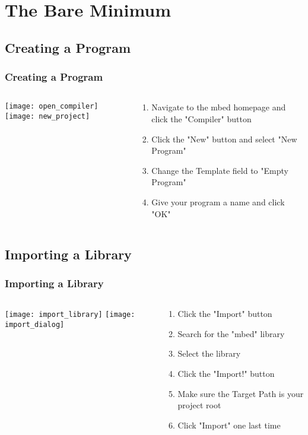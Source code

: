 \section{The Bare Minimum}
\label{sec:bare_minimum}

\subsection{Creating a Program}
\label{sub:creating_a_program}
\begin{frame}
	\frametitle{Creating a Program}
	\begin{columns}[T]
		\begin{column}{0.5\textwidth}
			\texttt{[image: open\_compiler]}
			\vspace{1ex}
			\texttt{[image: new\_project]}
		\end{column}
		\begin{column}{0.5\textwidth}
			\begin{enumerate}
				\item Navigate to the mbed homepage and click the "Compiler" button
				\item Click the "New" button and select "New Program"
				\item Change the Template field to "Empty Program"
				\item Give your program a name and click "OK"
			\end{enumerate}
		\end{column}
	\end{columns}
\end{frame}

\subsection{Importing a Library}
\label{sub:importing_a_library}
\begin{frame}
	\frametitle{Importing a Library}
	\begin{columns}[T]
		\begin{column}{0.5\textwidth}
			\texttt{[image: import\_library]}
			\vspace{1ex}
			\texttt{[image: import\_dialog]}
		\end{column}
		\begin{column}{0.5\textwidth}
			\begin{enumerate}
				\item Click the "Import" button
				\item Search for the "mbed" library
				\item Select the library
				\item Click the "Import!" button
				\item Make sure the Target Path is your project root
				\item Click "Import" one last time
			\end{enumerate}
		\end{column}
	\end{columns}
\end{frame}


